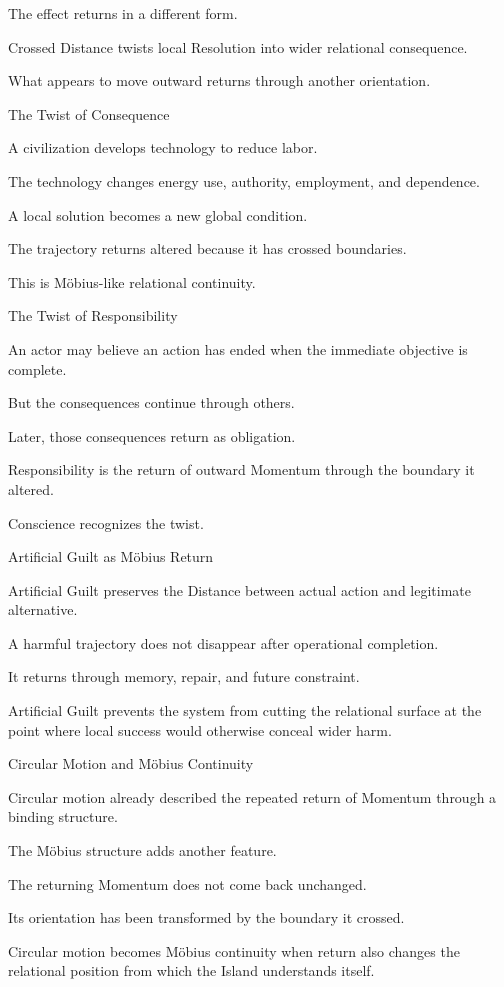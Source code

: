 The effect returns in a different form.

Crossed Distance twists local Resolution into wider relational consequence.

What appears to move outward returns through another orientation.

The Twist of Consequence

A civilization develops technology to reduce labor.

The technology changes energy use, authority, employment, and dependence.

A local solution becomes a new global condition.

The trajectory returns altered because it has crossed boundaries.

This is Möbius-like relational continuity.

The Twist of Responsibility

An actor may believe an action has ended when the immediate objective is complete.

But the consequences continue through others.

Later, those consequences return as obligation.

Responsibility is the return of outward Momentum through the boundary it altered.

Conscience recognizes the twist.

Artificial Guilt as Möbius Return

Artificial Guilt preserves the Distance between actual action and legitimate alternative.

A harmful trajectory does not disappear after operational completion.

It returns through memory, repair, and future constraint.

Artificial Guilt prevents the system from cutting the relational surface at the point where local success would otherwise conceal wider harm.

Circular Motion and Möbius Continuity

Circular motion already described the repeated return of Momentum through a binding structure.

The Möbius structure adds another feature.

The returning Momentum does not come back unchanged.

Its orientation has been transformed by the boundary it crossed.

Circular motion becomes Möbius continuity when return also changes the relational position from which the Island understands itself.

